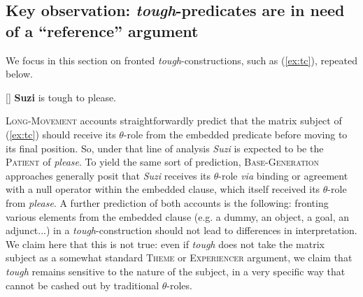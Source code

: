 \documentclass[11pt]{article}
\begin{document}
\subsection{Key observation: \textit{tough}-predicates are in need of a ``reference'' argument}\label{sec:reference-argument}
We focus in this section on fronted \textit{tough}-constructions, such as (\ref{ex:tc}), repeated below.
\begin{exe}
	 {\textbf{Suzi} is tough to please.}\label{ex:tc-repeated}
\end{exe}
\textsc{Long-Movement} accounts straightforwardly predict that the matrix subject of (\ref{ex:tc}) should receive its $\theta$-role from the embedded predicate before moving to its final position. So, under that line of analysis \textit{Suzi} is expected to be the \textsc{Patient} of \textit{please}. To yield the same sort of prediction, \textsc{Base-Generation} approaches generally posit that \textit{Suzi} receives its $\theta$-role \textit{via} binding or agreement with a null operator within the embedded clause, which itself received its $\theta$-role from \textit{please}. A further prediction of both accounts is the following: fronting various elements from the embedded clause (e.g. a dummy, an object, a goal, an adjunct...) in a \textit{tough}-construction should not lead to differences in interpretation. We claim here that this is not true: even if \textit{tough} does not take the matrix subject as a somewhat standard \textsc{Theme} or \textsc{Experiencer} argument, we claim that \textit{tough} remains sensitive to the nature of the subject, in a very specific way that cannot be cashed out by traditional $\theta$-roles.
\end{document}
